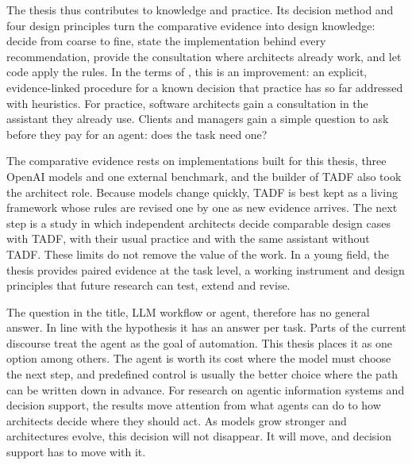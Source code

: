 The thesis thus contributes to knowledge and practice. Its decision method and four design principles turn the comparative evidence into design knowledge: decide from coarse to fine, state the implementation behind every recommendation, provide the consultation where architects already work, and let code apply the rules. In the terms of \textcite{gregorPositioningPresentingDesign2013}, this is an improvement: an explicit, evidence-linked procedure for a known decision that practice has so far addressed with heuristics. For practice, software architects gain a consultation in the assistant they already use. Clients and managers gain a simple question to ask before they pay for an agent: does the task need one?

The comparative evidence rests on implementations built for this thesis, three OpenAI models and one external benchmark, and the builder of TADF also took the architect role. Because models change quickly, TADF is best kept as a living framework whose rules are revised one by one as new evidence arrives. The next step is a study in which independent architects decide comparable design cases with TADF, with their usual practice and with the same assistant without TADF. These limits do not remove the value of the work. In a young field, the thesis provides paired evidence at the task level, a working instrument and design principles that future research can test, extend and revise.

The question in the title, LLM workflow or agent, therefore has no general answer. In line with the hypothesis it has an answer per task. Parts of the current discourse treat the agent as the goal of automation. This thesis places it as one option among others. The agent is worth its cost where the model must choose the next step, and predefined control is usually the better choice where the path can be written down in advance. For research on agentic information systems and decision support, the results move attention from what agents can do to how architects decide where they should act. As models grow stronger and architectures evolve, this decision will not disappear. It will move, and decision support has to move with it.




